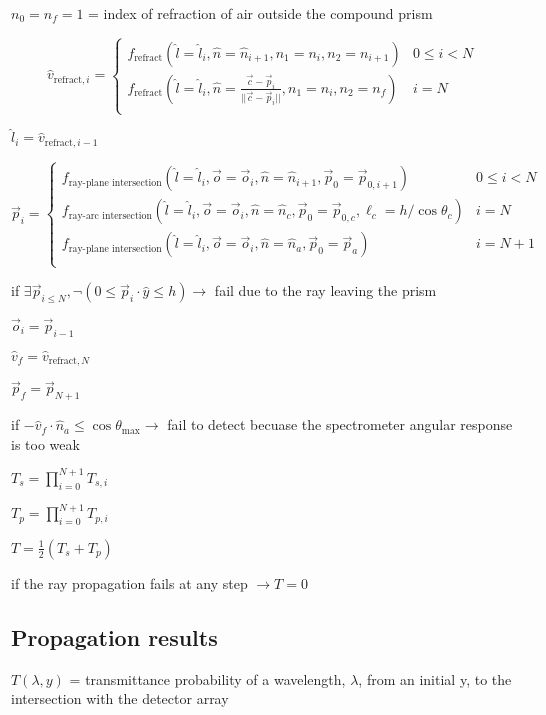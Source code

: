 \documentclass{article}
\begin{document}
$n_0 = n_f = 1$ = index of refraction of air outside the compound prism

\[\hat{v}_{\text{refract}, i} = \begin{cases}
		f_{\text{refract}}(\hat{l}=\hat{l}_i, \hat{n}=\hat{n}_{i+1}, n_1=n_i, n_2=n_{i+1})                                   & 0 \le i < N \\
		f_{\text{refract}}(\hat{l}=\hat{l}_i, \hat{n}=\frac{\vec{c} - \vec{p}_i}{||\vec{c} - \vec{p}_i||}, n_1=n_i, n_2=n_f) & i = N       \\
	\end{cases}\]

$\hat{l}_i = \hat{v}_{\text{refract}, i - 1}$

\[\vec{p}_i = \begin{cases}
		f_{\text{ray-plane intersection}}(\hat{l}=\hat{l}_i, \vec{o}=\vec{o}_i, \hat{n}=\hat{n}_{i+1}, \vec{p}_0=\vec{p}_{0, i+1})                    & 0 \le i < N \\
		f_{\text{ray-arc intersection}}(\hat{l}=\hat{l}_i, \vec{o}=\vec{o}_i, \hat{n}=\hat{n}_c, \vec{p}_0=\vec{p}_{0, c}, \ell_c=h/\cos{\theta_{c}}) & i = N       \\
		f_{\text{ray-plane intersection}}(\hat{l}=\hat{l}_i, \vec{o}=\vec{o}_i, \hat{n}=\hat{n}_{a}, \vec{p}_0=\vec{p}_a)                             & i = N + 1   \\
	\end{cases}\]

if $\exists \vec{p}_{i \le N}, \neg (0 \le \vec{p}_i \cdot \hat{y} \le h) \to$ fail due to the ray leaving the prism

$\vec{o}_i = \vec{p}_{i - 1}$

$\hat{v}_f = \hat{v}_{\text{refract}, N}$

$\vec{p}_f = \vec{p}_{N + 1}$

if $-\hat{v}_f \cdot \hat{n}_a \le \cos{\theta_{\text{max}}} \to$ fail to detect becuase the spectrometer angular response is too weak

$T_s = \prod_{i=0}^{N + 1} T_{s,i}$

$T_p = \prod_{i=0}^{N + 1} T_{p,i}$

$T = \frac{1}{2} (T_s + T_p)$

if the ray propagation fails at any step $\to T = 0$

\subsection{Propagation results}\label{subsec:propagation-results}
$T(\lambda, y)$ = transmittance probability of a wavelength, $\lambda$, from an initial y, to the intersection with the detector array
\end{document}
